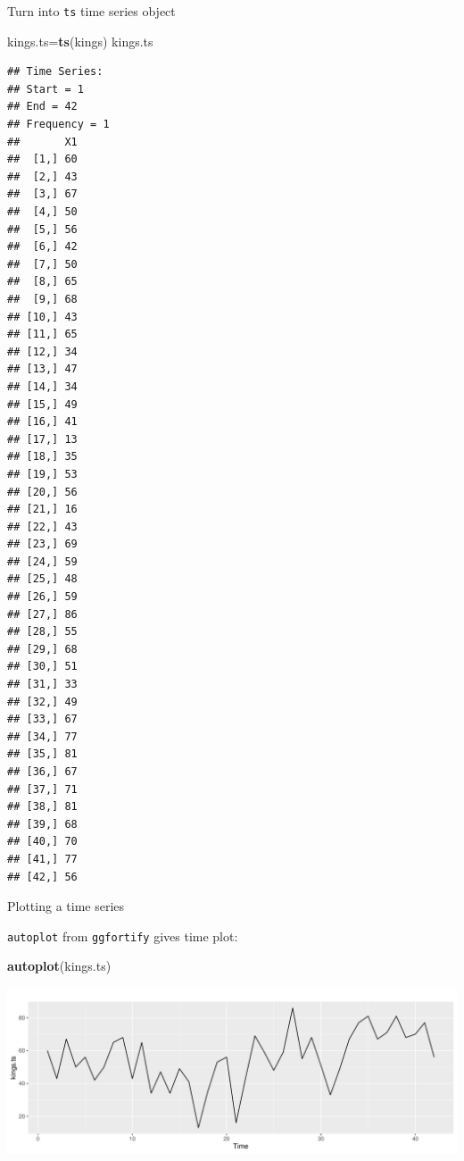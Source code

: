 \documentclass[
  ignorenonframetext,
]{beamer}
\newenvironment{Shaded}{\begin{snugshade}}{\end{snugshade}}
\newcommand{\KeywordTok}[1]{\textcolor[rgb]{0.13,0.29,0.53}{\textbf{#1}}}
\newcommand{\NormalTok}[1]{#1}
\begin{document}
\begin{frame}[fragile]{Turn into \texttt{ts} time series object}
\protect\hypertarget{turn-into-ts-time-series-object}{}

\begin{Shaded}
\begin{Highlighting}[]
\NormalTok{kings.ts=}\KeywordTok{ts}\NormalTok{(kings)}
\NormalTok{kings.ts}
\end{Highlighting}
\end{Shaded}

\begin{verbatim}
## Time Series:
## Start = 1 
## End = 42 
## Frequency = 1 
##       X1
##  [1,] 60
##  [2,] 43
##  [3,] 67
##  [4,] 50
##  [5,] 56
##  [6,] 42
##  [7,] 50
##  [8,] 65
##  [9,] 68
## [10,] 43
## [11,] 65
## [12,] 34
## [13,] 47
## [14,] 34
## [15,] 49
## [16,] 41
## [17,] 13
## [18,] 35
## [19,] 53
## [20,] 56
## [21,] 16
## [22,] 43
## [23,] 69
## [24,] 59
## [25,] 48
## [26,] 59
## [27,] 86
## [28,] 55
## [29,] 68
## [30,] 51
## [31,] 33
## [32,] 49
## [33,] 67
## [34,] 77
## [35,] 81
## [36,] 67
## [37,] 71
## [38,] 81
## [39,] 68
## [40,] 70
## [41,] 77
## [42,] 56
\end{verbatim}

\end{frame}

\begin{frame}[fragile]{Plotting a time series}
\protect\hypertarget{plotting-a-time-series}{}

\texttt{autoplot} from \texttt{ggfortify} gives time plot:

\begin{Shaded}
\begin{Highlighting}[]
\KeywordTok{autoplot}\NormalTok{(kings.ts)}
\end{Highlighting}
\end{Shaded}

\includegraphics{slides_d29_files/figure-beamer/Kings-Time-Series-1.pdf}

\end{frame}
\end{document}
